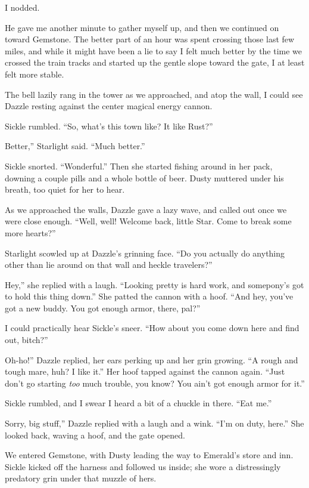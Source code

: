 I nodded.

He gave me another minute to gather myself up, and then we continued on toward Gemstone. The better part of an hour was spent crossing those last few miles, and while it might have been a lie to say I felt much better by the time we crossed the train tracks and started up the gentle slope toward the gate, I at least felt more stable.

The bell lazily rang in the tower as we approached, and atop the wall, I could see Dazzle resting against the center magical energy cannon.

Sickle rumbled. “So, what’s this town like? It like Rust?”

\leavevmode{}Better,” Starlight said. “Much better.”

Sickle snorted. “Wonderful.” Then she started fishing around in her pack, downing a couple pills and a whole bottle of beer. Dusty muttered under his breath, too quiet for her to hear.

As we approached the walls, Dazzle gave a lazy wave, and called out once we were close enough. “Well, well! Welcome back, little Star. Come to break some more hearts?”

Starlight scowled up at Dazzle’s grinning face. “Do you actually do anything other than lie around on that wall and heckle travelers?”

\leavevmode{}Hey,” she replied with a laugh. “Looking pretty is hard work, and somepony’s got to hold this thing down.” She patted the cannon with a hoof. “And hey, you’ve got a new buddy. You got enough armor, there, pal?”

I could practically hear Sickle’s sneer. “How about you come down here and find out, bitch?”

\leavevmode{}Oh-ho!” Dazzle replied, her ears perking up and her grin growing. “A rough and tough mare, huh? I like it.” Her hoof tapped against the cannon again. “Just don’t go starting \textit{too} much trouble, you know? You ain’t got enough armor for it.”

Sickle rumbled, and I swear I heard a bit of a chuckle in there. “Eat me.”

\leavevmode{}Sorry, big stuff,” Dazzle replied with a laugh and a wink. “I’m on duty, here.” She looked back, waving a hoof, and the gate opened.

We entered Gemstone, with Dusty leading the way to Emerald’s store and inn. Sickle kicked off the harness and followed us inside; she wore a distressingly predatory grin under that muzzle of hers.

